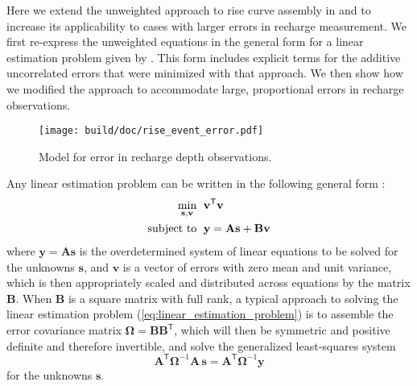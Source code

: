 \documentclass[11pt,a4paper]{article}
\renewcommand{\vec}[1]{\mathbf{#1}}
\begin{document}
Here we extend the unweighted approach to rise curve assembly in
\citet{Cobb_et_al_2017} and \citet{Cobb_and_Harvey_2019} to increase
its applicability to cases with larger errors in recharge measurement.
We first re-express the unweighted equations in the general form for a
linear estimation problem given by \citet{Paige_1979_computer}.  This
form includes explicit terms for the additive uncorrelated errors that
were minimized with that approach.  We then show how we modified the
approach to accommodate large, proportional errors in recharge
observations.

\begin{figure}[b!]
  \centerline{\texttt{[image: build/doc/rise\_event\_error.pdf]}}
  \caption{Model for error in recharge depth observations.}
  \label{fig:rise_event_error}
\end{figure}

Any linear estimation problem can be written in the following general
form \cite{Paige_1979_computer}:
\begin{equation}
  \label{eq:linear_estimation_problem}
  \begin{aligned}
    \min_{\vec{s},\vec{v}} \hspace{0.6em} & \vec{v}^\mathsf{T}\vec{v}\\
    \text{subject to} \hspace{0.6em} & \vec{y} = \vec{As} + \vec{Bv}
  \end{aligned}
\end{equation}
where $\vec{y} = \vec{As}$ is the overdetermined system of linear
equations to be solved for the unknowns $\vec{s}$, and $\vec{v}$ is a
vector of errors with zero mean and unit variance, which is then
appropriately scaled and distributed across equations by the matrix
$\vec{B}$.  When $\vec{B}$ is a square matrix with full rank, a
typical approach to solving the linear estimation problem
(\ref{eq:linear_estimation_problem}) is to assemble the error
covariance matrix $\bm\Omega = \vec{BB}^\mathsf{T}$, which will then be
symmetric and positive definite and therefore invertible, and solve
the generalized least-squares system
\begin{equation}
  \label{eq:gls}
  \vec{A}^\mathsf{T}\bm\Omega^{-1}\vec{A}\,\vec{s} = \vec{A}^\mathsf{T}\bm\Omega^{-1}\vec{y}
\end{equation}
for the unknowns $\vec{s}$.
\end{document}
